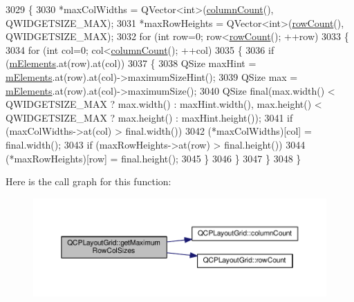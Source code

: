 \begin{DoxyCode}
3029 \{
3030   *maxColWidths = QVector<int>(\hyperlink{class_q_c_p_layout_grid_ac39074eafd148b82d0762090f258189e}{columnCount}(), QWIDGETSIZE\_MAX);
3031   *maxRowHeights = QVector<int>(\hyperlink{class_q_c_p_layout_grid_af8e6c7a05864ebe610c87756c7b9079c}{rowCount}(), QWIDGETSIZE\_MAX);
3032   \textcolor{keywordflow}{for} (\textcolor{keywordtype}{int} row=0; row<\hyperlink{class_q_c_p_layout_grid_af8e6c7a05864ebe610c87756c7b9079c}{rowCount}(); ++row)
3033   \{
3034     \textcolor{keywordflow}{for} (\textcolor{keywordtype}{int} col=0; col<\hyperlink{class_q_c_p_layout_grid_ac39074eafd148b82d0762090f258189e}{columnCount}(); ++col)
3035     \{
3036       \textcolor{keywordflow}{if} (\hyperlink{class_q_c_p_layout_grid_a3577d3855bf8ad20ef9079291a49f397}{mElements}.at(row).at(col))
3037       \{
3038         QSize maxHint = \hyperlink{class_q_c_p_layout_grid_a3577d3855bf8ad20ef9079291a49f397}{mElements}.at(row).at(col)->maximumSizeHint();
3039         QSize max = \hyperlink{class_q_c_p_layout_grid_a3577d3855bf8ad20ef9079291a49f397}{mElements}.at(row).at(col)->maximumSize();
3040         QSize \textcolor{keyword}{final}(max.width() < QWIDGETSIZE\_MAX ? max.width() : maxHint.width(), max.height() < 
      QWIDGETSIZE\_MAX ? max.height() : maxHint.height());
3041         \textcolor{keywordflow}{if} (maxColWidths->at(col) > \textcolor{keyword}{final}.width())
3042           (*maxColWidths)[col] = \textcolor{keyword}{final}.width();
3043         \textcolor{keywordflow}{if} (maxRowHeights->at(row) > \textcolor{keyword}{final}.height())
3044           (*maxRowHeights)[row] = \textcolor{keyword}{final}.height();
3045       \}
3046     \}
3047   \}
3048 \}
\end{DoxyCode}


Here is the call graph for this function\+:\nopagebreak
\begin{figure}[H]
\begin{center}
\leavevmode
\includegraphics[width=350pt]{class_q_c_p_layout_grid_af348d903e3b8bc416f1fe1b8125d1173_cgraph}
\end{center}
\end{figure}




